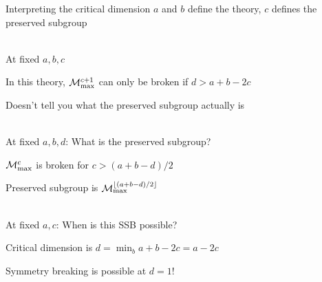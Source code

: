 \documentclass{beamer}
\newcommand{\M}[1]{\mathcal{M}_{\rm max}^{#1}}
\begin{document}
\begin{frame}{Interpreting the critical dimension}
$a$ and $b$ define the theory, $c$ defines the preserved subgroup\\\

At fixed $a,b,c$

\setlength{\leftskip}{1cm}

In this theory, $\M{c+1}$ can only be broken if $d > a+b-2c$

Doesn't tell you what the preserved subgroup actually is\\\

\setlength{\leftskip}{0cm}

At fixed $a,b,d$: What is the preserved subgroup?

\setlength{\leftskip}{1cm}

$\M{c}$ is broken for $c > (a+b-d)/2$

Preserved subgroup is $\M{\lfloor (a+b-d)/2 \rfloor} $\\\

\setlength{\leftskip}{0cm}

At fixed $a,c$: When is this SSB possible?

\setlength{\leftskip}{1cm}

Critical dimension is $d = \min_b a+b-2c = a-2c$

Symmetry breaking is possible at $d=1$!
\end{frame}
\end{document}
